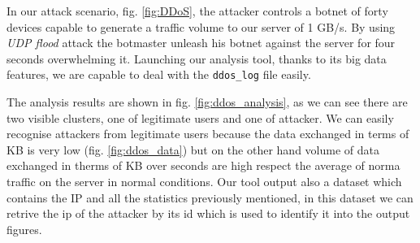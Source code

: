 In our attack scenario, fig. \ref{fig:DDoS},  the attacker controls a botnet of forty devices capable to generate a traffic volume to our server of 1 GB/s. By using \textit{UDP flood} attack the botmaster unleash his botnet against the server for four seconds overwhelming it. Launching our analysis tool, thanks to its big data features, we are capable to deal with the \texttt{ddos\_log} file easily.

The analysis results are shown in fig. \ref{fig:ddos_analysis}, as we can see there are two  visible clusters, one of legitimate users and one of attacker. We can easily recognise attackers from legitimate users because the data exchanged in terms of KB is very low (fig. \ref{fig:ddos_data}) but on the other hand volume of data exchanged in therms of KB over seconds are high respect the average of norma traffic on the server in normal conditions. Our tool output also a dataset which contains the IP and all the statistics previously mentioned, in this dataset we can retrive the ip of the attacker by its id which is used to identify it into the output figures. 












